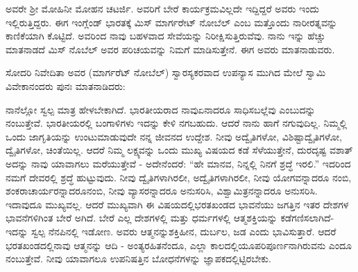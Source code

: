 ಅವರೇ ಶ‍್ರೀ ಮೋಹಿನೀ ಮೋಹನ ಚಟರ್ಜಿ. ಅವರಿಗೆ ಬೇರೆ ಕಾರ್ಯಕ್ರಮವಿಲ್ಲದೇ ಇದ್ದಿದ್ದರೆ ಅವರು ಇಂದು ಇಲ್ಲಿರುತ್ತಿದ್ದರು. ಈಗ ಇಂಗ್ಲೆಂಡ್​ ಭಾರತಕ್ಕೆ ಮಿಸ್​ ಮಾರ್ಗರೇಟ್​ ನೋಬೆಲ್​ ಎಂಬ ಮತ್ತೊಂದು ನಾರೀರತ್ನವನ್ನು ಕಾಣಿಕೆಯಾಗಿ ಕೊಟ್ಟಿದೆ. ಅವರಿಂದ ನಾವು ಬಹಳವಾದ ಸೇವೆಯನ್ನು ನಿರೀಕ್ಷಿಸುತ್ತಿರುವೆವು. ನಾನು ಇನ್ನು ಹೆಚ್ಚು ಮಾತನಾಡದೆ ಮಿಸ್​ ನೊಬೆಲ್​ ಅವರ ಪರಿಚಯವನ್ನು ನಿಮಗೆ ಮಾಡಿಸುತ್ತೇನೆ. ಈಗ ಅವರು ಮಾತನಾಡುವರು.

ಸೋದರಿ ನಿವೇದಿತಾ ಅವರ (ಮಾರ್ಗರೆಟ್​ ನೋಬೆಲ್​) ಸ್ವಾರಸ್ಯಕರವಾದ ಉಪನ್ಯಾಸ ಮುಗಿದ ಮೇಲೆ ಸ್ವಾಮಿ ವಿವೇಕಾನಂದರು ಪುನಃ ಮಾತನಾಡಿದರು:

ನಾನೆಲ್ಲೋ ಸ್ವಲ್ಪ ಮಾತ್ರ ಹೇಳಬೇಕಾಗಿದೆ. ಭಾರತೀಯರಾದ ನಾವು\break ಏನಾದರೂ ಸಾಧಿಸಬಲ್ಲೆವು ಎಂಬುದನ್ನು ನಂಬುತ್ತೇವೆ. ಭಾರತೀಯರಲ್ಲಿ ಬಂಗಾಳಿಗಳು ಇದನ್ನು ಕೇಳಿ ನಗಬಹುದು. ಆದರೆ ನಾನು ಹಾಗೆ ನಗುವು\-ದಿಲ್ಲ. ನಿಮ್ಮಲ್ಲಿ ಒಂದು ಜಾಗೃತಿಯನ್ನು ಉಂಟುಮಾಡುವುದೇ ನನ್ನ ಜೀವನದ ಉದ್ದೇಶ. ನೀವು ಅದ್ವೈತಿಗಳೋ, ವಿಶಿಷ್ಟಾದ್ವೈತಿಗಳೋ, ದ್ವೈತಿಗಳೋ, ಚಿಂತೆಯಿಲ್ಲ. ಆದರೆ ನಿಮ್ಮ ಲಕ್ಷ್ಯವನ್ನು ಒಂದು ಮುಖ್ಯ ವಿಷಯದ ಕಡೆ ಸೆಳೆಯುತ್ತೇನೆ, ದುರದೃಷ್ಟ ವಶಾತ್​ ಅದನ್ನು ನಾವು ಯಾವಾಗಲು ಮರೆಯುತ್ತೇವೆ - ಅದೇನೆಂದರೆ: “ಹೇ ಮಾನವ, ನಿನ್ನಲ್ಲಿ ನಿನಗೆ ಶ್ರದ್ಧೆ ಇರಲಿ.” ಇದರಿಂದ ನಮಗೆ ದೇವರಲ್ಲಿ ಶ್ರದ್ಧೆ ಹುಟ್ಟುವುದು. ನೀವು ದ್ವೈತಿಗಳಾಗಿರಲೀ, ಅದ್ವೈತಿಗಳಾಗಿರಲೀ, ನೀವು ಯೋಗವನ್ನಾದರೂ ನಂಬಿ, ಶಂಕರಾಚಾರ್ಯರನ್ನಾದರೂ\break ನಂಬಿ, ನೀವು ವ್ಯಾಸರನ್ನಾದರೂ ಅನುಸರಿಸಿ, ವಿಶ್ವಾಮಿತ್ರನನ್ನಾದರೂ ಅನುಸರಿಸಿ. ಇದಾವುದೂ ಮುಖ್ಯವಲ್ಲ. ಆದರೆ ಮುಖ್ಯವಾಗಿ ಈ ವಿಷಯದಲ್ಲಿ\break ಭರತಖಂಡದ ಭಾವನೆಯು ಜಗತ್ತಿನ ಇತರ ದೇಶಗಳ ಭಾವನೆಗಳಿಗಿಂತ ಬೇರೆ ಅಗಿದೆ. ಬೇರೆ ಎಲ್ಲ ದೇಶಗಳಲ್ಲಿ ಮತ್ತು ಧರ್ಮಗಳಲ್ಲಿ ಆತ್ಮಶಕ್ತಿಯನ್ನು ಕಡೆಗಣಿಸಲಾಗಿದೆ-ಇದನ್ನು ಸ್ವಲ್ಪ ನೆನಪಿನಲ್ಲಿ ಇಡೋಣ. ಅವರು ಆತ್ಮನನ್ನು\break ಶಕ್ತಿಹೀನ, ದುರ್ಬಲ, ಜಡ ಎಂದು ಭಾವಿಸುತ್ತಾರೆ. ಆದರೆ ಭರತಖಂಡದಲ್ಲಿ\break ನಾವು ಆತ್ಮನನ್ನು ಆದಿ - ಅಂತ್ಯರಹಿತನೆಂದೂ, ಎಲ್ಲಾ ಕಾಲದಲ್ಲಿಯೂ\break ಪರಿಪೂರ್ಣನಾಗಿರುವನು ಎಂದೂ ನಂಬುತ್ತೇವೆ. ನೀವು ಯಾವಾಗಲೂ ಉಪನಿಷತ್ತಿನ ಬೋಧನೆಗಳನ್ನು ಜ್ಞಾಪಕದಲ್ಲಿಟ್ಟಿರಬೇಕು.

